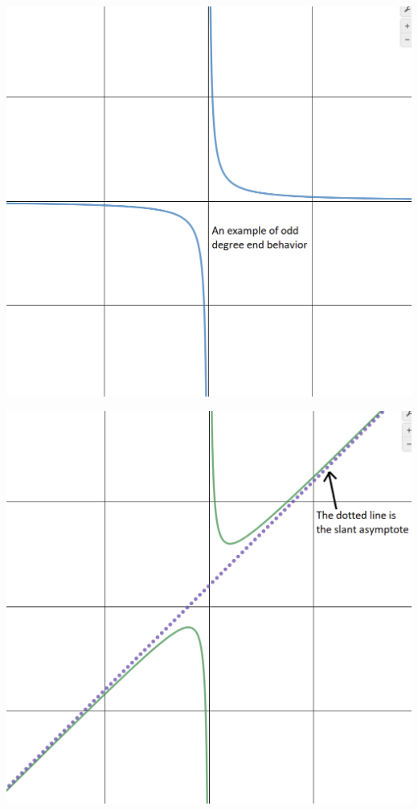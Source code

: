 \begin{info}
\begin{center}
\includegraphics[scale=.35]{odd_horiz_asymp_example.png}

\includegraphics[scale=.35]{slant_asymp_example.png}
\end{center}
\end{info}

